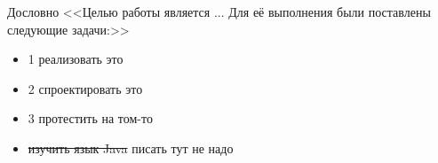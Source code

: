  Дословно <<Целью работы является ... Для её выполнения были поставлены следующие задачи:>>
 \begin{itemize}
 \item 1 реализовать это
 \item 2 спроектировать это
 \item 3 протестить на том-то
 \item \sout{изучить язык Java} писать тут не надо
 \end{itemize}
